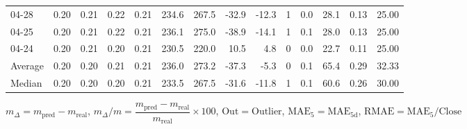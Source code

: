 \begin{threeparttable}
{\begin{tabular}{lrrrrrrrrrrrrr}
  04-28 &          0.20 &          0.21 &          0.22 &        0.21 &               234.6 &               267.5 &      -32.9 &        -12.3 &              1 &                 0.0 &             28.1 &            0.13 &                  25.00 \\
  04-25 &          0.20 &          0.21 &          0.22 &        0.21 &               236.1 &               275.0 &      -38.9 &        -14.1 &              1 &                 0.1 &             28.0 &            0.13 &                  25.00 \\
  04-24 &          0.20 &          0.21 &          0.20 &        0.21 &               230.5 &               220.0 &       10.5 &          4.8 &              0 &                 0.0 &             22.7 &            0.11 &                  25.00 \\
Average &          0.20 &          0.20 &          0.21 &        0.21 &               236.0 &               273.2 &      -37.3 &         -5.3 &              0 &                 0.1 &             65.4 &            0.29 &                  32.33 \\
 Median &          0.20 &          0.20 &          0.20 &        0.21 &               233.5 &               267.5 &      -31.6 &        -11.8 &              1 &                 0.1 &             60.6 &            0.26 &                  30.00 \\
\bottomrule
\end{tabular}
}
\begin{tablenotes}\footnotesize
\item $m_\Delta=m_{\text{pred}}-m_{\text{real}}$,
$m_\Delta/m=\dfrac{m_{\text{pred}}-m_{\text{real}}}{m_{\text{real}}}\times100$,
$\mathrm{Out}=\text{Outlier}$,
$\mathrm{MAE}_5=\mathrm{MAE}_{5\text{d}}$,
$\mathrm{RMAE}=\mathrm{MAE}_5/\text{Close}$
\end{tablenotes}
\end{threeparttable}
\endgroup

